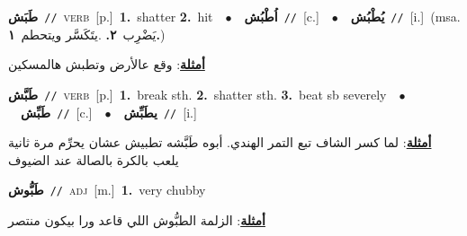 \documentclass[10pt,a4paper,twoside]{article} %
\begin{document}
\begin{multicols}{2}
{\setlength\topsep{0pt}\textbf{\foreignlanguage{arabic}{طَبَش}}\ {\color{gray}\texttt{//}\color{black}}\ \textsc{verb}\ [p.]\ \textbf{1.}~shatter  \textbf{2.}~hit\ \ $\bullet$\ \ \setlength\topsep{0pt}\textbf{\foreignlanguage{arabic}{اُطْبُش}}\ {\color{gray}\texttt{//}\color{black}}\ [c.]\ \ $\bullet$\ \ \setlength\topsep{0pt}\textbf{\foreignlanguage{arabic}{يُطْبُش}}\ {\color{gray}\texttt{//}\color{black}}\ [i.]\ \color{gray}(msa. \foreignlanguage{arabic}{يَضْرِب}~\foreignlanguage{arabic}{\textbf{٢.}}  .\foreignlanguage{arabic}{يتَكَسَّر ويتحطم}~\foreignlanguage{arabic}{\textbf{١.}})\color{black}\  \begin{flushright}\color{gray}\foreignlanguage{arabic}{\textbf{\underline{\foreignlanguage{arabic}{أمثلة}}}: وقع عالأرض وتطبش هالمسكين}\end{flushright}\color{black}} \vspace{2mm}

{\setlength\topsep{0pt}\textbf{\foreignlanguage{arabic}{طَبَّش}}\ {\color{gray}\texttt{//}\color{black}}\ \textsc{verb}\ [p.]\ \textbf{1.}~break sth.  \textbf{2.}~shatter sth.  \textbf{3.}~beat sb severely\ \ $\bullet$\ \ \setlength\topsep{0pt}\textbf{\foreignlanguage{arabic}{طَبِّش}}\ {\color{gray}\texttt{//}\color{black}}\ [c.]\ \ $\bullet$\ \ \setlength\topsep{0pt}\textbf{\foreignlanguage{arabic}{يطَبِّش}}\ {\color{gray}\texttt{//}\color{black}}\ [i.]\  \begin{flushright}\color{gray}\foreignlanguage{arabic}{\textbf{\underline{\foreignlanguage{arabic}{أمثلة}}}: لما كسر الشاف تبع التمر الهندي. أبوه طَبَّشه تطبيش عشان يحرِّم مرة ثانية يلعب بالكرة بالصالة عند الضيوف}\end{flushright}\color{black}} \vspace{2mm}

{\setlength\topsep{0pt}\textbf{\foreignlanguage{arabic}{طَبُّوش}}\ {\color{gray}\texttt{//}\color{black}}\ \textsc{adj}\ [m.]\ \textbf{1.}~very chubby\  \begin{flushright}\color{gray}\foreignlanguage{arabic}{\textbf{\underline{\foreignlanguage{arabic}{أمثلة}}}: الزلمة الطبُّوش اللي قاعد ورا بيكون منتصر}\end{flushright}\color{black}} \vspace{2mm}


\end{multicols}
\end{document}
